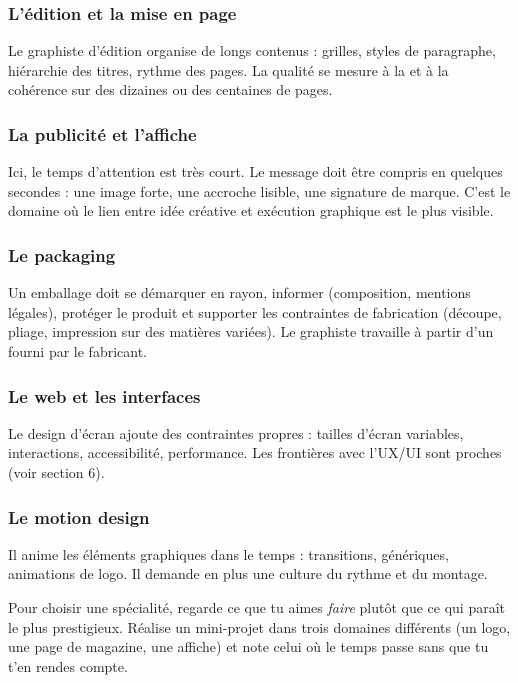 \subsubsection{L'édition et la mise en page}

Le graphiste d'édition organise de longs contenus : grilles, styles de paragraphe, hiérarchie des titres, rythme des pages. La qualité se mesure à la  et à la cohérence sur des dizaines ou des centaines de pages.

\subsubsection{La publicité et l'affiche}

Ici, le temps d'attention est très court. Le message doit être compris en quelques secondes : une image forte, une accroche lisible, une signature de marque. C'est le domaine où le lien entre idée créative et exécution graphique est le plus visible.

\subsubsection{Le packaging}

Un emballage doit se démarquer en rayon, informer (composition, mentions légales), protéger le produit et supporter les contraintes de fabrication (découpe, pliage, impression sur des matières variées). Le graphiste travaille à partir d'un  fourni par le fabricant.

\subsubsection{Le web et les interfaces}

Le design d'écran ajoute des contraintes propres : tailles d'écran variables, interactions, accessibilité, performance. Les frontières avec l'UX/UI sont proches (voir section 6).

\subsubsection{Le motion design}

Il anime les éléments graphiques dans le temps : transitions, génériques, animations de logo. Il demande en plus une culture du rythme et du montage.

\begin{astuce}
Pour choisir une spécialité, regarde ce que tu aimes \emph{faire} plutôt que ce qui paraît le plus prestigieux. Réalise un mini-projet dans trois domaines différents (un logo, une page de magazine, une affiche) et note celui où le temps passe sans que tu t'en rendes compte.
\end{astuce}

